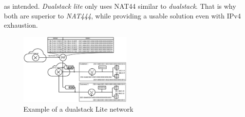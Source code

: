 \documentclass[format=sigconf, natbib=true, nonacm=true]{acmart}
\begin{document}
as intended. \textit{Dualstack lite} only uses NAT44 similar to \textit{dualstack}. That is why both are superior to \textit{NAT444}, while providing a usable solution even with IPv4 exhaustion\cite{Hughes2022_C08}.
    \begin{figure}
        \centering
        \includegraphics[width=0.5\textwidth]{images/dualstack_lite_network.png}
        \caption{Example of a dualstack Lite network}
        \label{fig:dualstack_lite_network}
    \end{figure}
\end{document}
